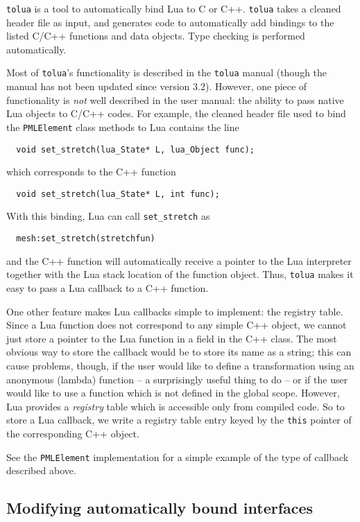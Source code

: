 \documentclass{article}
\newcommand{\ttt}[1]{\texttt{#1}}
\begin{document}
\ttt{tolua} is a tool to automatically bind Lua to C or C++.
\ttt{tolua} takes a cleaned header file as input, and generates
code to automatically add bindings to the listed C/C++ functions and
data objects.  Type checking is performed automatically.

Most of \ttt{tolua}'s functionality is described in the
\ttt{tolua} manual (though the manual has not been updated since
version 3.2).  However, one piece of functionality is \emph{not} well
described in the user manual: the ability to pass native Lua objects
to C/C++ codes.  For example, the cleaned header file used to bind the
\ttt{PMLElement} class methods to Lua contains the line
\begin{verbatim}
  void set_stretch(lua_State* L, lua_Object func);
\end{verbatim}
which corresponds to the C++ function
\begin{verbatim}
  void set_stretch(lua_State* L, int func);
\end{verbatim}
With this binding, Lua can call \ttt{set\_stretch} as
\begin{verbatim}
  mesh:set_stretch(stretchfun)
\end{verbatim}
and the C++ function will automatically receive a pointer to the Lua
interpreter together with the Lua stack location of the function object.
Thus, \ttt{tolua} makes it easy to pass a Lua callback to a C++ function.

One other feature makes Lua callbacks simple to implement: the
registry table.  Since a Lua function does not correspond to any
simple C++ object, we cannot just store a pointer to the Lua function
in a field in the C++ class.  The most obvious way to store the
callback would be to store its name as a string; this can cause
problems, though, if the user would like to define a transformation
using an anonymous (lambda) function -- a surprisingly useful thing to
do -- or if the user would like to use a function which is not defined
in the global scope.  However, Lua provides a \emph{registry} table
which is accessible only from compiled code.  So to store a Lua
callback, we write a registry table entry keyed by the \ttt{this}
pointer of the corresponding C++ object.

See the \ttt{PMLElement} implementation for a simple example of
the type of callback described above.


\subsection{Modifying automatically bound interfaces}
\end{document}
